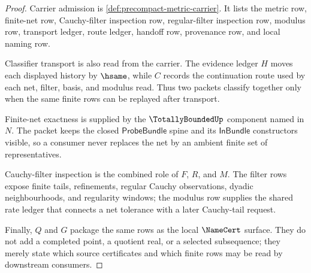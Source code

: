\begin{proof}
Carrier admission is \autoref{def:precompact-metric-carrier}. It lists the
metric row, finite-net row, Cauchy-filter inspection row, regular-filter
inspection row, modulus row, transport ledger, route ledger, handoff row,
provenance row, and local naming row.

Classifier transport is also read from the carrier. The evidence ledger $H$
moves each displayed history by $\hsame$, while $C$ records the continuation
route used by each net, filter, basis, and modulus read. Thus two packets
classify together only when the same finite rows can be replayed after
transport.

Finite-net exactness is supplied by the $\TotallyBoundedUp$ component named in
$N$. The packet keeps the closed $\mathsf{ProbeBundle}$ spine and its
$\mathsf{InBundle}$ constructors visible, so a consumer never replaces the
net by an ambient finite set of representatives.

Cauchy-filter inspection is the combined role of $F$, $R$, and $M$. The
filter rows expose finite tails, refinements, regular Cauchy observations,
dyadic neighbourhoods, and regularity windows; the modulus row supplies the
shared rate ledger that connects a net tolerance with a later Cauchy-tail
request.

Finally, $Q$ and $G$ package the same rows as the local $\NameCert$ surface.
They do not add a completed point, a quotient real, or a selected subsequence;
they merely state which source certificates and which finite rows may be read
by downstream consumers.
\end{proof}

